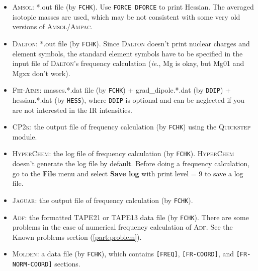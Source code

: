 \documentclass[12pt,english]{extarticle}
\begin{document}
\begin{itemize}
are used, which may be not consistent with some very old versions of \textsc{Mopac}.
\item \textsc{Amsol}: *.out file (by \verb|FCHK|). Use \texttt{FORCE DFORCE} to print
Hessian. The averaged isotopic masses are used, which may be not
consistent with some very old versions of \textsc{Amsol/Ampac}.
\item \textsc{Dalton}: *.out file (by \verb|FCHK|). Since \textsc{Dalton} doesn't print nuclear
charges and element symbols, the standard element symbols have to be
specified in the input file of \textsc{Dalton}'s frequency calculation (\emph{ie.}, Mg is
okay, but Mg01 and Mgxx don't work).
\item \textsc{Fhi-Aims}: masses.*.dat file (by \verb|FCHK|) + grad{\_}dipole.*.dat (by
\verb|DDIP|) + hessian.*.dat (by \verb|HESS|), where \verb|DDIP| is
optional and can be neglected if you are not interested in the IR
intensities.
\item \textsc{CP2k}: the output file of frequency calculation (by \verb|FCHK|) using the
\textsc{Quickstep} module.
\item \textsc{HyperChem}: the log file of frequency calculation (by \verb|FCHK|).
\textsc{HyperChem} doesn't generate the log file by default. Before doing a frequency
calculation, go to the \textbf{File} menu and select \textbf{Save log} with print level = 9 to save a
log file.
\item \textsc{Jaguar}: the output file of frequency calculation (by \verb|FCHK|).
\item \textsc{Adf}: the formatted TAPE21 or TAPE13 data file (by \verb|FCHK|). There are
some problems in the case of numerical frequency calculation of \textsc{Adf}. See the
Known problems section (\ref{part:problem}).
\item \textsc{Molden}: a data file (by \verb|FCHK|), which contains \verb|[FREQ]|,
\verb|[FR-COORD]|, and \verb|[FR-NORM-COORD]| sections.

\end{itemize}
\end{document}

